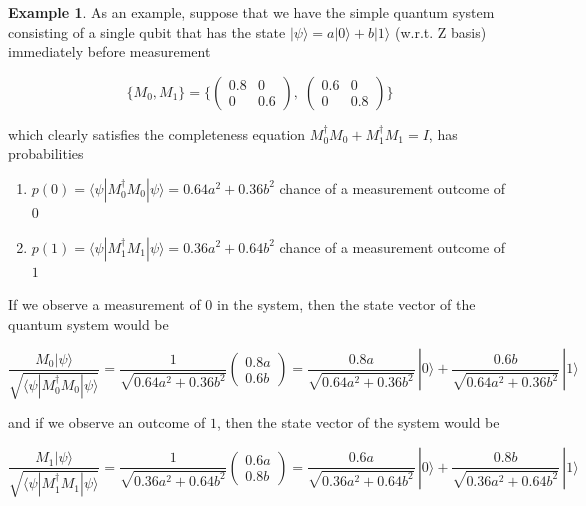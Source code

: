 \documentclass{article}
\theoremstyle{definition}
\newtheorem{example}{Example}[section]
\begin{document}
    
    \begin{example}
      As an example, suppose that we have the simple quantum system consisting of a single qubit that has the state $|\psi \rangle = a|0\rangle + b|1 \rangle$  (w.r.t. Z basis) immediately before measurement

        \[\{M_0, M_1\} = \bigg\{ \begin{pmatrix} 0.8 & 0 \\  0 & 0.6 \end{pmatrix}, \; \begin{pmatrix} 0.6&0\\0&0.8 \end{pmatrix} \bigg\}\]

      which clearly satisfies the completeness equation $M_0^\dagger M_0 + M_1^\dagger M_1 = I$, has probabilities

      \begin{enumerate}
        \item $p(0) = \langle \psi | M_0^\dagger M_0 | \psi \rangle = 0.64 a^2 + 0.36b^2$ chance of a measurement outcome of $0$
        \item $p(1) = \langle \psi | M_1^\dagger M_1 | \psi \rangle = 0.36 a^2 + 0.64b^2$ chance of a measurement outcome of $1$
      \end{enumerate}

      If we observe a measurement of $0$ in the system, then the state vector of the quantum system would be

        \[\frac{M_0 | \psi\rangle}{\sqrt{\langle \psi | M_0^\dagger M_0 | \psi\rangle}} = \frac{1}{\sqrt{0.64a^2 + 0.36b^2}} \begin{pmatrix} 0.8a \\ 0.6b \end{pmatrix} = \frac{0.8a}{\sqrt{0.64a^2 + 0.36b^2}}\, |0 \rangle + \frac{0.6 b}{\sqrt{0.64a^2 + 0.36b^2}} \, |1\rangle\]

      and if we observe an outcome of $1$, then the state vector of the system would be

        \[\frac{M_1 | \psi\rangle}{\sqrt{\langle \psi | M_1^\dagger M_1 | \psi\rangle}} = \frac{1}{\sqrt{0.36a^2 + 0.64b^2}} \begin{pmatrix} 0.6a \\ 0.8b \end{pmatrix} = \frac{0.6a}{\sqrt{0.36a^2 + 0.64b^2}}\, |0 \rangle + \frac{0.8 b}{\sqrt{0.36a^2 + 0.64b^2}} \, |1\rangle\]
    \end{example}
\end{document}
